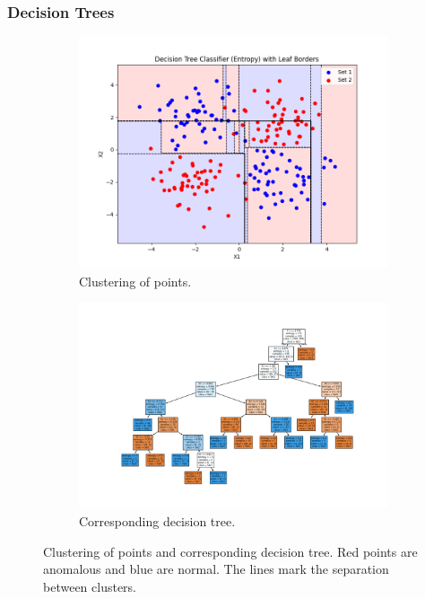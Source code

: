 \documentclass[oneside, a4paper, onecolumn, 11pt]{article}
\begin{document}
\subsubsection{Decision Trees}
\begin{figure}[H]
  \centering
  \begin{subfigure}{0.35\textwidth}
      \centering
      \includegraphics[width=\linewidth]{images/tree_border.png}
      \caption{Clustering of points.}
  \end{subfigure}
  \begin{subfigure}{0.35\textwidth}
      \centering
      \includegraphics[width=\linewidth]{images/decision_tree.png}
      \caption{Corresponding decision tree.}
  \end{subfigure}
  \caption{Clustering of points and corresponding decision tree. Red points are anomalous and blue are normal. The lines mark the separation between clusters.}
  \label{fig:decision_tree}
\end{figure}
\end{document}
